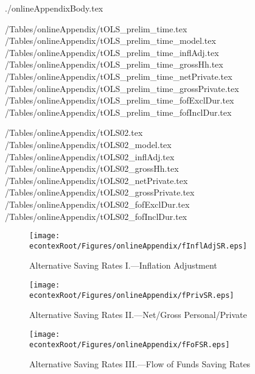 \documentclass{\econtex}
\begin{document}

\begin{verbatimwrite}{./onlineAppendixBody.tex}
  
\econtexRoot/Tables/onlineAppendix/tOLS_prelim_time.tex
\econtexRoot/Tables/onlineAppendix/tOLS_prelim_time_model.tex
\econtexRoot/Tables/onlineAppendix/tOLS_prelim_time_inflAdj.tex
\econtexRoot/Tables/onlineAppendix/tOLS_prelim_time_grossHh.tex
\econtexRoot/Tables/onlineAppendix/tOLS_prelim_time_netPrivate.tex
\econtexRoot/Tables/onlineAppendix/tOLS_prelim_time_grossPrivate.tex
\econtexRoot/Tables/onlineAppendix/tOLS_prelim_time_fofExclDur.tex
\econtexRoot/Tables/onlineAppendix/tOLS_prelim_time_fofInclDur.tex

\clearpage
\econtexRoot/Tables/onlineAppendix/tOLS02.tex
\econtexRoot/Tables/onlineAppendix/tOLS02_model.tex
\econtexRoot/Tables/onlineAppendix/tOLS02_inflAdj.tex
\econtexRoot/Tables/onlineAppendix/tOLS02_grossHh.tex
\econtexRoot/Tables/onlineAppendix/tOLS02_netPrivate.tex
\econtexRoot/Tables/onlineAppendix/tOLS02_grossPrivate.tex
\econtexRoot/Tables/onlineAppendix/tOLS02_fofExclDur.tex
\econtexRoot/Tables/onlineAppendix/tOLS02_fofInclDur.tex
\clearpage


\begin{figure}
\caption{Alternative Saving Rates I.---Inflation Adjustment}
\begin{center} \label{fInflAdjSR}
\texttt{[image: \\econtexRoot/Figures/onlineAppendix/fInflAdjSR.eps]}
\end{center}
\end{figure}

\begin{figure}
\caption{Alternative Saving Rates II.---Net/Gross Personal/Private}
\begin{center} \label{fPrivSR}
\texttt{[image: \\econtexRoot/Figures/onlineAppendix/fPrivSR.eps]}
\end{center}
\end{figure}

\begin{figure}
\caption{Alternative Saving Rates III.---Flow of Funds Saving Rates}
\begin{center} \label{fFoFSR}
\texttt{[image: \\econtexRoot/Figures/onlineAppendix/fFoFSR.eps]}
\end{center}
\end{figure}
\clearpage


\end{verbatimwrite}
\end{document}
